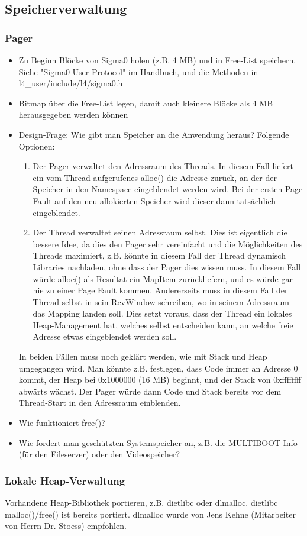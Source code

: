 \subsection{Speicherverwaltung}

\subsubsection{Pager}

\begin{itemize}
	\item Zu Beginn Blöcke von Sigma0 holen (z.B. 4 MB) und in Free-List speichern. Siehe "Sigma0 User Protocol" im Handbuch, und die Methoden in l4\_user/include/l4/sigma0.h
	
	\item Bitmap über die Free-List legen, damit auch kleinere Blöcke als 4 MB herausgegeben werden können
	
	\item Design-Frage: Wie gibt man Speicher an die Anwendung heraus? Folgende Optionen:
	\begin{enumerate}
		\item Der Pager verwaltet den Adressraum des Threads. In diesem Fall liefert ein vom Thread aufgerufenes alloc() die Adresse zurück, an der der Speicher in den Namespace eingeblendet werden wird. Bei der ersten Page Fault auf den neu allokierten Speicher wird dieser dann tatsächlich eingeblendet.
		 \item Der Thread verwaltet seinen Adressraum selbst. Dies ist eigentlich die bessere Idee, da dies den Pager sehr vereinfacht und die Möglichkeiten des Threads maximiert, z.B. könnte in diesem Fall der Thread dynamisch Libraries nachladen, ohne dass der Pager dies wissen muss. In diesem Fall würde alloc() als Resultat ein MapItem zurückliefern, und es würde gar nie zu einer Page Fault kommen. Andererseits muss in diesem Fall der Thread selbst in sein RcvWindow schreiben, wo in seinem Adressraum das Mapping landen soll. Dies setzt voraus, dass der Thread ein lokales Heap-Management hat, welches selbst entscheiden kann, an welche freie Adresse etwas eingeblendet werden soll.
	\end{enumerate}
	
	In beiden Fällen muss noch geklärt werden, wie mit Stack und Heap umgegangen wird. Man könnte z.B. festlegen, dass Code immer an Adresse 0 kommt, der Heap bei 0x1000000 (16 MB) beginnt, und der Stack von 0xffffffff abwärts wächst. Der Pager würde dann Code und Stack bereits vor dem Thread-Start in den Adressraum einblenden. 
	
	\item Wie funktioniert free()?
	
	\item Wie fordert man geschützten Systemspeicher an, z.B. die MULTIBOOT-Info (für den Fileserver) oder den Videospeicher?
\end{itemize}

\subsubsection{Lokale Heap-Verwaltung}

Vorhandene Heap-Bibliothek portieren, z.B. dietlibc oder dlmalloc. dietlibc malloc()/free() ist bereits portiert. dlmalloc wurde von Jens Kehne (Mitarbeiter von Herrn Dr. Stoess) empfohlen.

